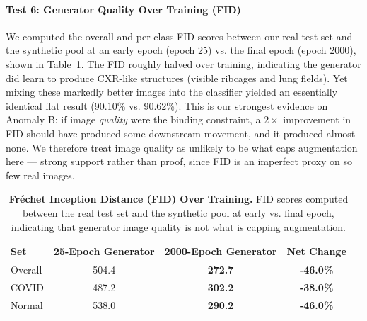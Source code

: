 \documentclass[11pt]{article}
\begin{document}
\paragraph{Test 6: Generator Quality Over Training (FID)}
We computed the overall and per-class FID scores between our real test set and the synthetic pool at an early epoch (epoch 25) vs. the final epoch (epoch 2000), shown in Table~\ref{tab:fid}. The FID roughly halved over training, indicating the generator did learn to produce CXR-like structures (visible ribcages and lung fields). Yet mixing these markedly better images into the classifier yielded an essentially identical flat result (90.10\% vs. 90.62\%). This is our strongest evidence on Anomaly B: if image \emph{quality} were the binding constraint, a $2\times$ improvement in FID should have produced some downstream movement, and it produced almost none. We therefore treat image quality as unlikely to be what caps augmentation here --- strong support rather than proof, since FID is an imperfect proxy on so few real images.


\begin{table}[htbp]
\centering
\caption{\textbf{Fr\'{e}chet Inception Distance (FID) Over Training.} FID scores computed between the real test set and the synthetic pool at early vs. final epoch, indicating that generator image quality is not what is capping augmentation.}
\label{tab:fid}
\begin{tabular}{@{}lccc@{}}
\toprule
\textbf{Set} & \textbf{25-Epoch Generator} & \textbf{2000-Epoch Generator} & \textbf{Net Change} \\
\midrule
Overall & 504.4 & \textbf{272.7} & \textbf{-46.0\%} \\
COVID & 487.2 & \textbf{302.2} & \textbf{-38.0\%} \\
Normal & 538.0 & \textbf{290.2} & \textbf{-46.0\%} \\
\bottomrule
\end{tabular}
\end{table}
\end{document}
